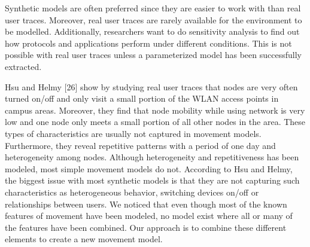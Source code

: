 Synthetic models are often preferred since they are easier to work with than real user traces. Moreover, real user traces are rarely available for the environment to be modelled. Additionally, researchers want to do sensitivity analysis to find out how protocols and applications perform under different conditions. This is not possible with real user traces unless a parameterized model has been successfully extracted. 





Hsu and Helmy [26] show by studying real user traces that nodes are very often turned
on/off and only visit a small portion of the WLAN access points in campus areas.
Moreover, they find that node mobility while using network is very low and one node
only meets a small portion of all other nodes in the area. These types of characteristics
are usually not captured in movement models. Furthermore, they reveal repetitive
patterns with a period of one day and heterogeneity among nodes. Although
heterogeneity and repetitiveness has been modeled, most simple movement models do
not. According to Hsu and Helmy, the biggest issue with most synthetic models is that
they are not capturing such characteristics as heterogeneous behavior, switching
devices on/off or relationships between users.
We noticed that even though most of the known features of movement have been
modeled, no model exist where all or many of the features have been combined. Our
approach is to combine these different elements to create a new movement model.


